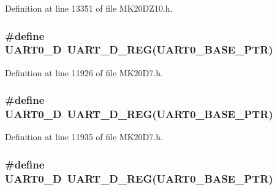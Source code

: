 Definition at line 13351 of file M\+K20\+D\+Z10.\+h.

\subsubsection[{\texorpdfstring{U\+A\+R\+T0\+\_\+D}{UART0_D}}]{\setlength{\rightskip}{0pt plus 5cm}\#define U\+A\+R\+T0\+\_\+D~{\bf U\+A\+R\+T\+\_\+\+D\+\_\+\+R\+EG}({\bf U\+A\+R\+T0\+\_\+\+B\+A\+S\+E\+\_\+\+P\+TR})}\hypertarget{group___u_a_r_t___register___accessor___macros_ga2dea5280025ba01ef69f0fa6a6505cf1}{}\label{group___u_a_r_t___register___accessor___macros_ga2dea5280025ba01ef69f0fa6a6505cf1}


Definition at line 11926 of file M\+K20\+D7.\+h.

\subsubsection[{\texorpdfstring{U\+A\+R\+T0\+\_\+D}{UART0_D}}]{\setlength{\rightskip}{0pt plus 5cm}\#define U\+A\+R\+T0\+\_\+D~{\bf U\+A\+R\+T\+\_\+\+D\+\_\+\+R\+EG}({\bf U\+A\+R\+T0\+\_\+\+B\+A\+S\+E\+\_\+\+P\+TR})}\hypertarget{group___u_a_r_t___register___accessor___macros_ga2dea5280025ba01ef69f0fa6a6505cf1}{}\label{group___u_a_r_t___register___accessor___macros_ga2dea5280025ba01ef69f0fa6a6505cf1}


Definition at line 11935 of file M\+K20\+D7.\+h.

\subsubsection[{\texorpdfstring{U\+A\+R\+T0\+\_\+D}{UART0_D}}]{\setlength{\rightskip}{0pt plus 5cm}\#define U\+A\+R\+T0\+\_\+D~{\bf U\+A\+R\+T\+\_\+\+D\+\_\+\+R\+EG}({\bf U\+A\+R\+T0\+\_\+\+B\+A\+S\+E\+\_\+\+P\+TR})}\hypertarget{group___u_a_r_t___register___accessor___macros_ga2dea5280025ba01ef69f0fa6a6505cf1}{}\label{group___u_a_r_t___register___accessor___macros_ga2dea5280025ba01ef69f0fa6a6505cf1}


